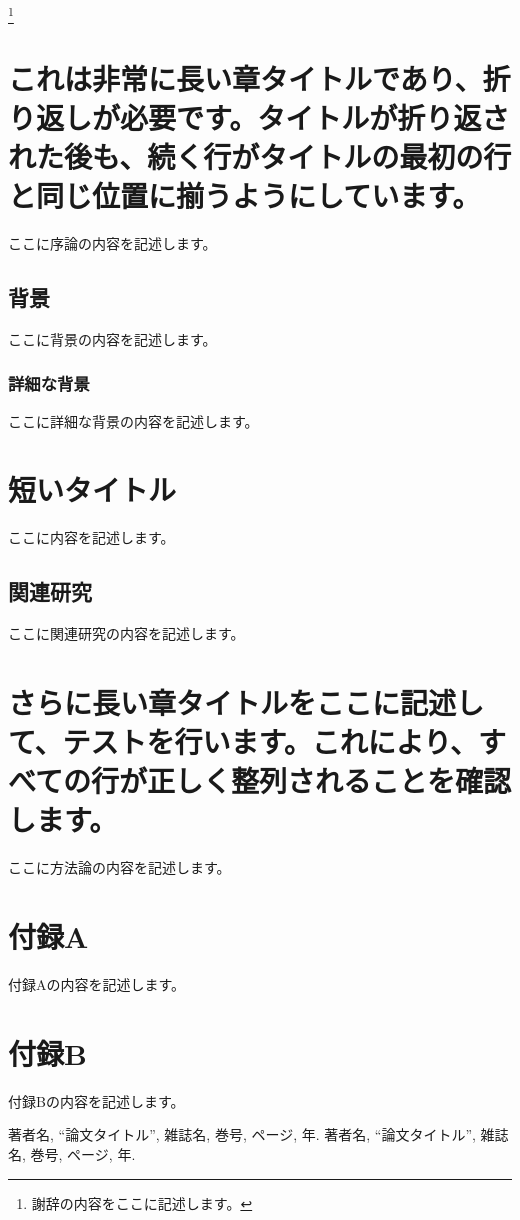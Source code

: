 \documentclass{lab_thesis}
\begin{document}
\Maketitle

\frontmatter

\tableofcontents
\listoffigures
\listoftables

\mainmatter

\thanks{謝辞の内容をここに記述します。}

\chapter{これは非常に長い章タイトルであり、折り返しが必要です。タイトルが折り返された後も、続く行がタイトルの最初の行と同じ位置に揃うようにしています。}
ここに序論の内容を記述します。

\section{背景}
ここに背景の内容を記述します。

\subsection{詳細な背景}
ここに詳細な背景の内容を記述します。

\chapter{短いタイトル}
ここに内容を記述します。

\section{関連研究}
ここに関連研究の内容を記述します。

\chapter{さらに長い章タイトルをここに記述して、テストを行います。これにより、すべての行が正しく整列されることを確認します。}
ここに方法論の内容を記述します。

\appendix
\chapter{付録A}
付録Aの内容を記述します。

\chapter{付録B}
付録Bの内容を記述します。

\begin{thebibliography}{99}
 著者名, ``論文タイトル'', 雑誌名, 巻号, ページ, 年.
 著者名, ``論文タイトル'', 雑誌名, 巻号, ページ, 年.
\end{thebibliography}
\end{document}
